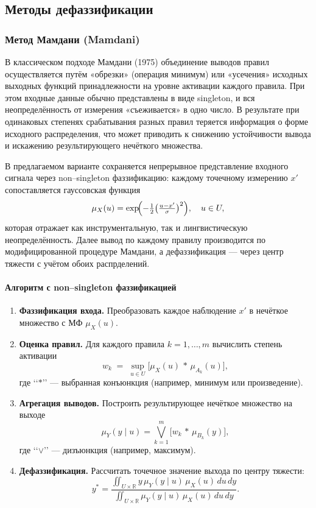 \subsection{Методы дефаззификации}
\label{subsec:other_defuzz}

\subsubsection{Метод Мамдани (Mamdani)}
\label{sec:mamdani}

В классическом подходе Мамдани (1975) объединение выводов правил осуществляется путём «обрезки» (операция минимум) или «усечения» исходных выходных функций принадлежности на уровне активации каждого правила. При этом входные данные обычно представлены в виде singleton, и вся неопределённость от измерения «съеживается» в одно число. В результате при одинаковых степенях срабатывания разных правил теряется информация о форме исходного распределения, что может приводить к снижению устойчивости вывода и искажению результирующего нечёткого множества.

В предлагаемом варианте сохраняется непрерывное представление входного сигнала через non–singleton фаззификацию: каждому точечному измерению $x'$ сопоставляется гауссовская функция
\[
  \mu_X(u)
  = \exp\!\Bigl(-\tfrac12\bigl(\tfrac{u - x'}{\sigma}\bigr)^2\Bigr), 
  \quad u\in U,
\]
которая отражает как инструментальную, так и лингвистическую неопределённость. Далее вывод по каждому правилу производится по модифицированной процедуре Мамдани, а дефаззификация — через центр тяжести с учётом обоих распрделений.

\paragraph{Алгоритм с non–singleton фаззификацией}
\begin{enumerate}
  \item \textbf{Фаззификация входа.} Преобразовать каждое наблюдение $x'$ в нечёткое множество с МФ $\mu_X(u)$.
  \item \textbf{Оценка правил.} Для каждого правила $k=1,\dots,m$ вычислить степень активации
  \[
    w_k \;=\;\sup_{u\in U}\bigl[\mu_X(u)\,\ast\,\mu_{A_k}(u)\bigr],
  \]
  где ‘‘$\ast$’’ — выбранная конъюнкция (например, минимум или произведение).
  \item \textbf{Агрегация выводов.} Построить результирующее нечёткое множество на выходе
  \[
    \mu_Y(y\mid u)
    = \bigvee_{k=1}^{m}\bigl[w_k \,\ast\, \mu_{B_k}(y)\bigr],
  \]
  где ‘‘$\vee$’’ — дизъюнкция (например, максимум).
  \item \textbf{Дефаззификация.} Рассчитать точечное значение выхода по центру тяжести:
  \[
    y^* 
    = 
    \frac{\displaystyle\iint_{U\times\mathbb R}
      y\,\mu_Y(y\mid u)\,\mu_X(u)\,du\,dy}
         {\displaystyle\iint_{U\times\mathbb R}
      \mu_Y(y\mid u)\,\mu_X(u)\,du\,dy}.
  \]
\end{enumerate}

